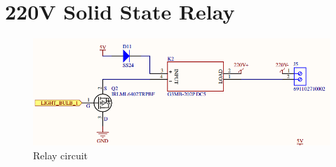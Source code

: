 \documentclass[../../main.tex]{subfiles}
\begin{document}
\section{220V Solid State Relay}
\begin{figure}[H]
    \begin{center}
        \includegraphics[scale=0.5]{relay_circuit.png}
    \end{center}
    \caption{Relay circuit}
    \label{fig:relay_circuit}
\end{figure}
\end{document}
